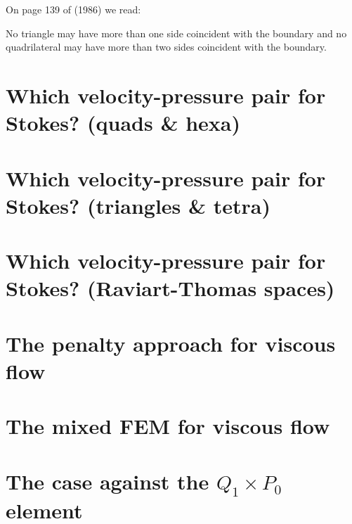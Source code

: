 On page 139 of \textcite{caod86} (1986) we read:
\begin{displayquote}
{\color{darkgray}
No triangle may have more than one side coincident with the boundary
and no quadrilateral may have more than two sides coincident with the boundary.
}
\end{displayquote}

\newpage %
\section{Which velocity-pressure pair for Stokes? (quads \& hexa) \label{ss:pair_quads}}

\newpage %
\section{Which velocity-pressure pair for Stokes? (triangles \& tetra) \label{ss:pair_triangles}}

\newpage %
\section{Which velocity-pressure pair for Stokes? (Raviart-Thomas spaces)\label{ss:raviart_thomas}}


\newpage %
\section{The penalty approach for viscous flow}\label{sec:penalty} %

\newpage %
\section{The mixed FEM for viscous flow} \label{sec:mixed}  %

\newpage %
\section{The case against the $Q_1\times P_0$ element}  %


